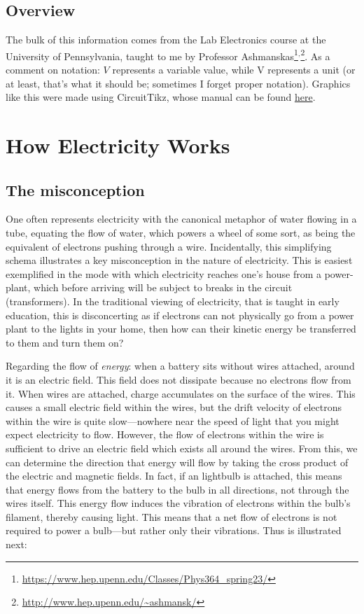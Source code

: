 \documentclass[12pt]{report}
\begin{document}
\subsection{Overview} 
The bulk of this information comes from the Lab Electronics course at the University of Pennsylvania, taught to me by Professor Ashmanskas\footnote{\url{https://www.hep.upenn.edu/Classes/Phys364_spring23/}}$^,$\footnote{\url{http://www.hep.upenn.edu/~ashmansk/}}. As a comment on notation: $V$ represents a variable value, while V represents a unit (or at least, that's what it should be; sometimes I forget proper notation). Graphics like this were made using CircuitTikz, whose manual can be found \href{https://texdoc.org/serve/circuitikz/0}{here}.\newline

\section{How Electricity Works} 
\subsection{The misconception} One often represents electricity with the canonical metaphor of water flowing in a tube, equating the flow of water, which powers a wheel of some sort, as being the equivalent of electrons pushing through a wire. Incidentally, this simplifying schema illustrates a key misconception in the nature of electricity. This is easiest exemplified in the mode with which electricity reaches one's house from a power-plant, which before arriving will be subject to breaks in the circuit (transformers). In the traditional viewing of electricity, that is taught in early education, this is disconcerting as if electrons can not physically go from a power plant to the lights in your home, then how can their kinetic energy be transferred to them and turn them on?\newline

Regarding the flow of \textit{energy}: when a battery sits without wires attached, around it is an electric field. This field does not dissipate because no electrons flow from it. When wires are attached, charge accumulates on the surface of the wires. This causes a small electric field within the wires, but the drift velocity of electrons within the wire is quite slow---nowhere near the speed of light that you might expect electricity to flow. However, the flow of electrons within the wire is sufficient to drive an electric field which exists all around the wires. From this, we can determine the direction that energy will flow by taking the cross product of the electric and magnetic fields. In fact, if an lightbulb is attached, this means that energy flows from the battery to the bulb in all directions, not through the wires itself. This energy flow induces the vibration of electrons within the bulb's filament, thereby causing light. This means that a net flow of electrons is not required to power a bulb---but rather only their vibrations. Thus is illustrated next:\newline 
\end{document}
